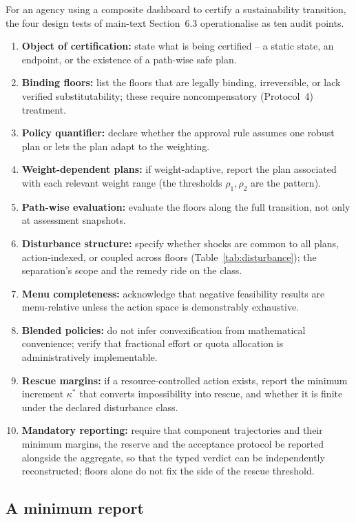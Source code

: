 For an agency using a composite dashboard to certify a sustainability transition, the four design tests of main-text Section~6.3 operationalise as ten audit points.
\begin{enumerate}[leftmargin=2em]
\item \textbf{Object of certification:} state what is being certified -- a static state, an endpoint, or the existence of a path-wise safe plan.
\item \textbf{Binding floors:} list the floors that are legally binding, irreversible, or lack verified substitutability; these require noncompensatory (Protocol~4) treatment.
\item \textbf{Policy quantifier:} declare whether the approval rule assumes one robust plan or lets the plan adapt to the weighting.
\item \textbf{Weight-dependent plans:} if weight-adaptive, report the plan associated with each relevant weight range (the thresholds $\rho_1,\rho_2$ are the pattern).
\item \textbf{Path-wise evaluation:} evaluate the floors along the full transition, not only at assessment snapshots.
\item \textbf{Disturbance structure:} specify whether shocks are common to all plans, action-indexed, or coupled across floors (Table~\ref{tab:disturbance}); the separation's scope and the remedy ride on the class.
\item \textbf{Menu completeness:} acknowledge that negative feasibility results are menu-relative unless the action space is demonstrably exhaustive.
\item \textbf{Blended policies:} do not infer convexification from mathematical convenience; verify that fractional effort or quota allocation is administratively implementable.
\item \textbf{Rescue margins:} if a resource-controlled action exists, report the minimum increment $\kappa^*$ that converts impossibility into rescue, and whether it is finite under the declared disturbance class.
\item \textbf{Mandatory reporting:} require that component trajectories and their minimum margins, the reserve and the acceptance protocol be reported alongside the aggregate, so that the typed verdict can be independently reconstructed; floors alone do not fix the side of the rescue threshold.
\end{enumerate}

\subsection{A minimum report}

